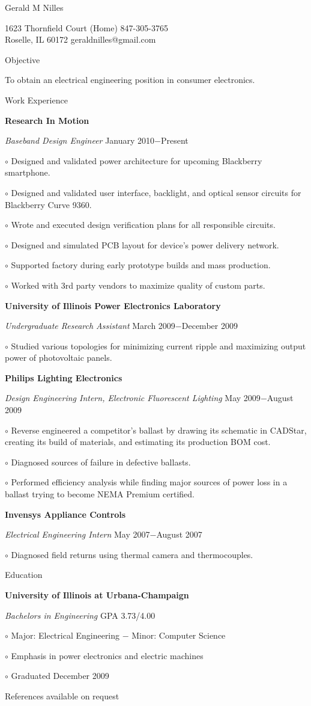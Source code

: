 \documentclass[12pt, letterpaper]{article}
\newcommand{\myname}[1]{{\begin{center} \LARGE #1 \end{center} \par }}
\newcommand{\myhead}[1]{{\vspace{2mm} \Large #1 \par}}
\newcommand{\objective}[1]{{\addtolength{\leftskip}{10mm} #1 \par }}
\newcommand{\company}[1]{{\vspace{1mm} \addtolength{\leftskip}{10mm} \textbf{#1} \par}}
\newcommand{\position}[2]{{\addtolength{\leftskip}{10mm} \emph{#1} \hfill #2 \par \vspace{1mm}}}
\newcommand{\skill}[1]{{  \vspace{0.3mm} \addtolength{\leftskip}{20mm} \setlength\parindent{-4mm} $\circ$ #1 \par}}
\begin{document}
\pagestyle{empty}
\raggedright

\myname{Gerald M Nilles}
1623 Thornfield Court  \hfill (Home) 847-305-3765 \\
Roselle, IL 60172   \hfill geraldnilles@gmail.com \\
\myhead{Objective}
    \objective{To obtain an electrical engineering position in consumer electronics.}

\myhead{Work Experience}
    \company{Research In Motion}
    \position{Baseband Design Engineer}{January 2010$-$Present}
        \skill{Designed and validated power architecture for upcoming Blackberry smartphone.}
        \skill{Designed and validated user interface, backlight, and optical sensor circuits for Blackberry Curve 9360.}
        \skill{Wrote and executed design verification plans for all responsible circuits.}
        \skill{Designed and simulated PCB layout for device's power delivery network.}
        \skill{Supported factory during early prototype builds and mass production.}
        \skill{Worked with 3rd party vendors to maximize quality of custom parts.}

    \company{University of Illinois Power Electronics Laboratory}
    \position{Undergraduate Research Assistant}{March 2009$-$December 2009}
        \skill{Studied various topologies for minimizing current ripple and maximizing output power of photovoltaic panels.}

    \company{Philips Lighting Electronics} 
    \position{Design Engineering Intern, Electronic Fluorescent Lighting}{May 2009$-$August 2009}
        \skill{Reverse engineered a competitor's ballast by drawing its schematic in CADStar, creating its build of materials, and estimating its production BOM cost.}
        \skill{Diagnosed sources of failure in defective ballasts.}
        \skill{Performed efficiency analysis while finding major sources of power loss in a ballast trying to become NEMA Premium certified.}

    \company{Invensys Appliance Controls}
    \position{Electrical Engineering Intern}{May 2007$-$August 2007}
        \skill{Diagnosed field returns using thermal camera and thermocouples.}

\myhead{Education}
    \company{University of Illinois at Urbana-Champaign}
    \position{Bachelors in Engineering}{GPA 3.73/4.00}
        \skill{Major: Electrical Engineering $-$ Minor: Computer Science}
        \skill{Emphasis in power electronics and electric machines}
        \skill{Graduated December 2009}

\begin{center}
\small
References available on request
\end{center}
\end{document}
